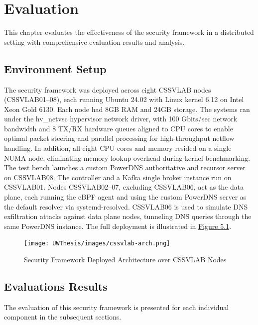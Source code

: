 \documentclass [11pt, proquest] {uwthesis}[2020/02/24]
\begin{document}





\chapter{Evaluation}
This chapter evaluates the effectiveness of the security framework in a distributed setting with  comprehensive evaluation results and analysis.


\section{Environment Setup}
The security framework was deployed across eight CSSVLAB nodes (CSSVLAB{01–08}), each running Ubuntu 24.02 with Linux kernel 6.12 on Intel Xeon Gold 6130. Each node had 8GB RAM and 24GB storage. The systems ran under the hv\_netvsc hypervisor network driver, with 100 Gbits/sec network bandwidth and 8 TX/RX hardware queues aligned to CPU cores to enable optimal packet steering and parallel processing for high-throughput netflow handling. In addition, all eight CPU cores and memory resided on a single NUMA node, eliminating memory lookup overhead during kernel benchmarking. The test bench launches a custom PowerDNS authoritative and recursor server on CSSVLAB08. The controller and a Kafka single broker instance run on CSSVLAB01. Nodes CSSVLAB{02–07}, excluding CSSVLAB06, act as the data plane, each running the eBPF agent and using the custom PowerDNS server as the default resolver via systemd-resolved. CSSVLAB06 is used to simulate DNS exfiltration attacks against data plane nodes, tunneling DNS queries through the same PowerDNS instance. The full deployment is illustrated in \hyperref[sec:deployed-arch]{Figure 5.1}.


\begin{figure}[h]
\centering
\texttt{[image: UWThesis/images/cssvlab-arch.png]}
\caption{Security Framework Deployed Architecture over CSSVLAB Nodes}
\label{sec:deployed-arch}
\end{figure}


\section{Evaluations Results}
The evaluation of this security framework is presented for each individual component in the subsequent sections.
\end{document}
